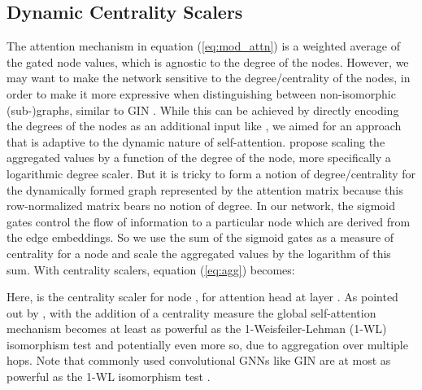 \documentclass[sigconf,authorversion]{acmart}
\begin{document}
\subsection{Dynamic Centrality Scalers}
The attention mechanism in equation (\ref{eq:mod_attn}) is a weighted average of the gated node values, which is agnostic to the degree of the nodes. However, we may want to make the network sensitive to the degree/centrality of the nodes, in order to make it more expressive when distinguishing between non-isomorphic (sub-)graphs, similar to GIN \cite{xu2018powerful}. While this can be achieved by directly encoding the degrees of the nodes as an additional input like \citep{ying2021transformers}, we aimed for an approach that is adaptive to the dynamic nature of self-attention. \citet{corso2020principal} propose scaling the aggregated values by a function of the degree of the node, more specifically a logarithmic degree scaler. But it is tricky to form a notion of degree/centrality for the dynamically formed graph represented by the attention matrix because this row-normalized matrix bears no notion of degree. In our network, the sigmoid gates control the flow of information to a particular node which are derived from the edge embeddings. So we use the sum of the sigmoid gates as a measure of centrality for a node and scale the aggregated values by the logarithm of this sum. With centrality scalers, equation (\ref{eq:agg}) becomes:

Here,  is the centrality scaler for node , for attention head  at layer . As pointed out by \citet{ying2021transformers}, with the addition of a centrality measure the global self-attention mechanism becomes at least as powerful as the 1-Weisfeiler-Lehman (1-WL) isomorphism test and potentially even more so, due to aggregation over multiple hops. Note that commonly used convolutional GNNs like GIN are at most as powerful as the 1-WL isomorphism test \cite{xu2018powerful}.
\end{document}
